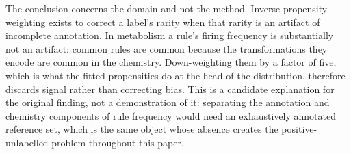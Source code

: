 The conclusion concerns the domain and not the method. Inverse-propensity weighting exists
to correct a label's rarity when that rarity is an artifact of incomplete annotation. In metabolism
a rule's firing frequency is substantially not an artifact: common rules are common because the
transformations they encode are common in the chemistry. Down-weighting them by a factor of five,
which is what the fitted propensities do at the head of the distribution, therefore discards signal
rather than correcting bias. This is a candidate explanation for the original finding, not a
demonstration of it: separating the annotation and chemistry components of rule frequency would
need an exhaustively annotated reference set, which is the same object whose absence creates the
positive-unlabelled problem throughout this paper.
